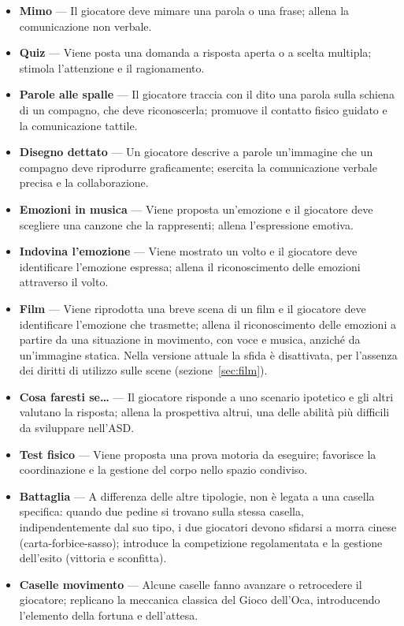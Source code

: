\documentclass[12pt]{report}
\begin{document}
\begin{itemize}
    \item \textbf{Mimo} --- Il giocatore deve mimare una parola o una frase; allena la comunicazione non verbale.
    \item \textbf{Quiz} --- Viene posta una domanda a risposta aperta o a scelta multipla; stimola l'attenzione e il ragionamento.
    \item \textbf{Parole alle spalle} --- Il giocatore traccia con il dito una parola sulla schiena di un compagno, che deve riconoscerla; promuove il contatto fisico guidato e la comunicazione tattile.
    \item \textbf{Disegno dettato} --- Un giocatore descrive a parole un'immagine che un compagno deve riprodurre graficamente; esercita la comunicazione verbale precisa e la collaborazione.
    \item \textbf{Emozioni in musica} --- Viene proposta un'emozione e il giocatore deve scegliere una canzone che la rappresenti; allena l'espressione emotiva.
    \item \textbf{Indovina l'emozione} --- Viene mostrato un volto e il giocatore deve identificare l'emozione espressa; allena il riconoscimento delle emozioni attraverso il volto.
    \item \textbf{Film} --- Viene riprodotta una breve scena di un film e il giocatore deve identificare l'emozione che trasmette; allena il riconoscimento delle emozioni a partire da una situazione in movimento, con voce e musica, anziché da un'immagine statica. Nella versione attuale la sfida è disattivata, per l'assenza dei diritti di utilizzo sulle scene (sezione~\ref{sec:film}).
    \item \textbf{Cosa faresti se\dots} --- Il giocatore risponde a uno scenario ipotetico e gli altri valutano la risposta; allena la prospettiva altrui, una delle abilità più difficili da sviluppare nell'ASD.
    \item \textbf{Test fisico} --- Viene proposta una prova motoria da eseguire; favorisce la coordinazione e la gestione del corpo nello spazio condiviso.
    \item \textbf{Battaglia} --- A differenza delle altre tipologie, non è legata a una casella specifica: quando due pedine si trovano sulla stessa casella, indipendentemente dal suo tipo, i due giocatori devono sfidarsi a morra cinese (carta-forbice-sasso); introduce la competizione regolamentata e la gestione dell'esito (vittoria e sconfitta).
    \item \textbf{Caselle movimento} --- Alcune caselle fanno avanzare o retrocedere il giocatore; replicano la meccanica classica del Gioco dell'Oca, introducendo l'elemento della fortuna e dell'attesa.
\end{itemize}
\end{document}
